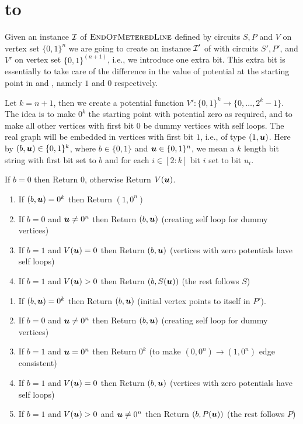 \section{\EOML to \EOPL}
\label{sec:EOMLtoEOPL}

Given an instance $\mbox{${\mathcal I}$}$ of $\textsc{EndOfMeteredLine}$ defined by circuits $S,P$ and $V$ on vertex
set $\{0,1\}^n$ we are going to create an instance $\mbox{${\mathcal I}$}'$ of \EOPL with circuits
$S',P'$, and $V'$ on vertex set $\{0,1\}^{(n+1)}$, i.e., we introduce one extra bit.  
This extra bit is essentially to take care of the difference in the value of potential 
at the starting point in \EOML and \EOPL, namely $1$ and $0$ respectively. 

Let $k=n+1$, then we create a potential function $V':\{0,1\}^k \rightarrow
\{0,\dots,2^k-1\}$. 
The idea is to make $0^k$ the starting point with potential zero as required,
and to make all other vertices with first bit $0$ be dummy vertices with self
loops. The real graph
will be embedded in vertices with first bit $1$, i.e., of type $(1,\mbox{\boldmath $u$})$. Here
by $(b,\mbox{\boldmath $u$})\in \{0,1\}^k$, where $b\in \{0,1\}$ and $\mbox{\boldmath $u$}\in \{0,1\}^n$, we mean
a $k$ length bit string with first bit set to $b$ and for each $i\in[2:k]$ bit $i$ 
set to bit $u_i$. %

\medskip
\medskip

 If $b=0$ then Return $0$, otherwise Return $V(\mbox{\boldmath $u$})$. 
\medskip
\medskip

\vspace{-0.3cm}

\begin{enumerate}
\item If $(b,\mbox{\boldmath $u$})=0^k$ then Return $(1,0^n)$
\item If $b=0$ and $\mbox{\boldmath $u$}\neq 0^n$ then Return $(b,\mbox{\boldmath $u$})$ (creating self loop for dummy vertices)
\item If $b=1$ and $V(\mbox{\boldmath $u$})=0$ then Return $(b,\mbox{\boldmath $u$})$ (vertices with zero potentials have self loops)
\item If $b=1$ and $V(\mbox{\boldmath $u$})>0$ then Return $(b,S(\mbox{\boldmath $u$}))$ (the rest follows $S$)
\end{enumerate}

\vspace{-0.3cm}

\begin{enumerate}
\item If $(b,\mbox{\boldmath $u$})=0^k$ then Return $(b,\mbox{\boldmath $u$})$ (initial vertex points to itself in $P'$).
\item If $b=0$ and $\mbox{\boldmath $u$}\neq 0^n$ then Return $(b,\mbox{\boldmath $u$})$ (creating self loop for dummy vertices)
\item If $b=1$ and $\mbox{\boldmath $u$}=0^n$ then Return $0^k$ (to make $(0,0^n)\rightarrow (1,0^n)$ edge consistent)
\item If $b=1$ and $V(\mbox{\boldmath $u$})=0$ then Return $(b,\mbox{\boldmath $u$})$ (vertices with zero potentials have self loops)
\item If $b=1$ and $V(\mbox{\boldmath $u$})>0$ and $\mbox{\boldmath $u$} \neq 0^n$ then Return $(b,P(\mbox{\boldmath $u$}))$ (the rest follows $P$)
\end{enumerate}

